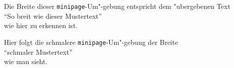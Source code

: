 \documentclass{article}
\newlength{\breite}
\newenvironment{varpage}[1]
   {\settowidth{\breite}{#1}\begin{minipage}{\breite}}
   {\end{minipage}}
\begin{document}
\noindent
\begin{varpage}{``So breit wie dieser Mustertext''}
  Die Breite dieser \texttt{minipage}-Um"-gebung entspricht dem "ubergebenen
  Text\\
  ``So breit wie dieser Mustertext''\\
  wie  hier zu erkennen ist.
\end{varpage}\quad
\begin{varpage}{``schmaler Mustertext''}
  Hier folgt die schmalere \texttt{minipage}-Um"-gebung der Breite\\
  ``schmaler Mustertext''\\
  wie man sieht.
\end{varpage}
\end{document}
